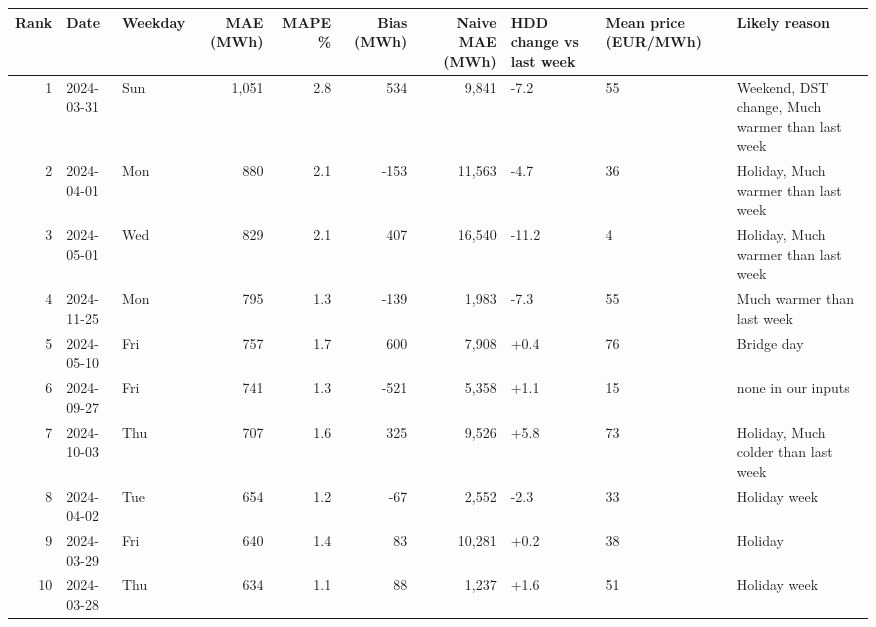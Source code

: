\begin{tabular}{rllrrrrlll}
\toprule
Rank & Date & Weekday & MAE (MWh) & MAPE \% & Bias (MWh) & Naive MAE (MWh) & HDD change vs last week & Mean price (EUR/MWh) & Likely reason \\
\midrule
1 & 2024-03-31 & Sun & 1,051 & 2.8 & 534 & 9,841 & -7.2 & 55 & Weekend, DST change, Much warmer than last week \\
2 & 2024-04-01 & Mon & 880 & 2.1 & -153 & 11,563 & -4.7 & 36 & Holiday, Much warmer than last week \\
3 & 2024-05-01 & Wed & 829 & 2.1 & 407 & 16,540 & -11.2 & 4 & Holiday, Much warmer than last week \\
4 & 2024-11-25 & Mon & 795 & 1.3 & -139 & 1,983 & -7.3 & 55 & Much warmer than last week \\
5 & 2024-05-10 & Fri & 757 & 1.7 & 600 & 7,908 & +0.4 & 76 & Bridge day \\
6 & 2024-09-27 & Fri & 741 & 1.3 & -521 & 5,358 & +1.1 & 15 & none in our inputs \\
7 & 2024-10-03 & Thu & 707 & 1.6 & 325 & 9,526 & +5.8 & 73 & Holiday, Much colder than last week \\
8 & 2024-04-02 & Tue & 654 & 1.2 & -67 & 2,552 & -2.3 & 33 & Holiday week \\
9 & 2024-03-29 & Fri & 640 & 1.4 & 83 & 10,281 & +0.2 & 38 & Holiday \\
10 & 2024-03-28 & Thu & 634 & 1.1 & 88 & 1,237 & +1.6 & 51 & Holiday week \\
\bottomrule
\end{tabular}
